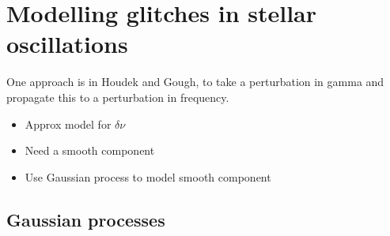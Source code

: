 \section[Modelling the glitch]{Modelling glitches in stellar oscillations}

One approach is in Houdek and Gough, to take a perturbation in gamma and propagate this to a perturbation in frequency.

\begin{itemize}
    \item Approx model for \(\delta\nu\)
    \item Need a smooth component
    \item Use Gaussian process to model smooth component
\end{itemize}

\subsection{Gaussian processes }\label{sec:glitch-gp}


